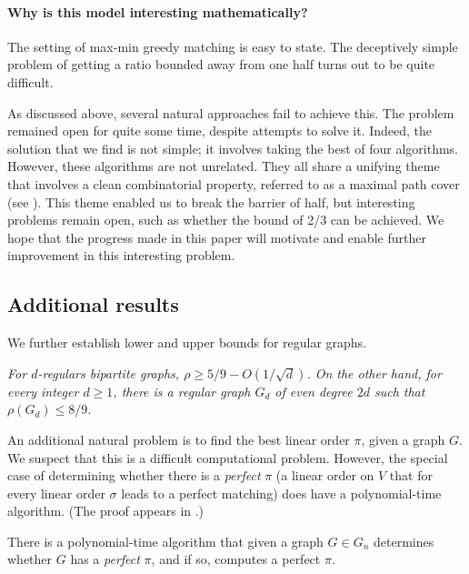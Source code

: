 \documentclass{toc}
\theoremstyle{plain}
\begin{document}
%
%
%
%
%
%

%

\paragraph*{Why is this model interesting mathematically?} The setting of max-min greedy matching is easy to state.
%
%
%
The deceptively simple problem of getting a ratio bounded away
from one half turns out to be quite difficult.   %

As discussed above, several natural approaches fail to achieve this. The problem remained open for quite some time, despite attempts to solve it. Indeed, the solution that we find is not simple; it involves taking the best of four algorithms. However, these algorithms are not unrelated. They all share a unifying theme that involves a clean combinatorial property, referred to as a maximal path cover (see ). This theme enabled us to break the barrier of half, but interesting problems remain open, such as whether the bound of 2/3 can be achieved. We hope that the progress made in this
%
paper   %
will motivate and enable further improvement in this interesting problem.

\subsection{Additional results}
We further establish lower and upper bounds for regular graphs.

\vspace{0.1in}
%
\emph{For $d$-regulars bipartite graphs, $\rho \ge 5/9 - O(1/\sqrt{d})$.
On the other hand, for every integer $d \ge 1$, there is a regular graph $G_{d}$ of even degree $2d$ such that $\rho(G_{d}) \le 8/9$.}
\vspace{0.1in}

An additional natural problem is to find the best linear order $\pi$, given a graph $G$.
We suspect that this is a difficult computational problem.
However, the special case of determining whether there is a \emph{perfect} $\pi$ (a linear order on $V$ that for every linear order $\sigma$ leads to a perfect matching) does have a polynomial-time algorithm.  %
%
%
(The proof appears in .)

\vspace{0.1in}
\begin{theorem}
	\label{thm:perfect-pi}
There is a polynomial-time algorithm that given a graph $G \in G_n$ determines whether $G$ has a \emph{perfect} $\pi$, and if so,
%
computes   %
a perfect $\pi$.
\end{theorem}
\end{document}
